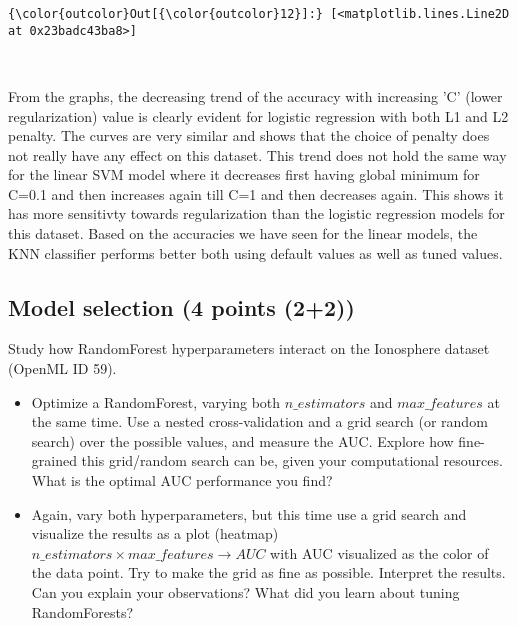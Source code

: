 \documentclass[11pt]{article}
\providecommand{\tightlist}{%
      \setlength{\itemsep}{0pt}\setlength{\parskip}{0pt}}
\begin{document}
            \begin{Verbatim}[commandchars=\\\{\}]
{\color{outcolor}Out[{\color{outcolor}12}]:} [<matplotlib.lines.Line2D at 0x23badc43ba8>]
\end{Verbatim}
        
    \begin{center}
    \end{center}
    { \hspace*{\fill} \\}
    
    From the graphs, the decreasing trend of the accuracy with increasing
'C' (lower regularization) value is clearly evident for logistic
regression with both L1 and L2 penalty. The curves are very similar and
shows that the choice of penalty does not really have any effect on this
dataset. This trend does not hold the same way for the linear SVM model
where it decreases first having global minimum for C=0.1 and then
increases again till C=1 and then decreases again. This shows it has
more sensitivty towards regularization than the logistic regression
models for this dataset. Based on the accuracies we have seen for the
linear models, the KNN classifier performs better both using default
values as well as tuned values.

    \subsection{Model selection (4 points
(2+2))}\label{model-selection-4-points-22}

Study how RandomForest hyperparameters interact on the Ionosphere
dataset (OpenML ID 59).

\begin{itemize}
\tightlist
\item
  Optimize a RandomForest, varying both \(n\_estimators\) and
  \(max\_features\) at the same time. Use a nested cross-validation and
  a grid search (or random search) over the possible values, and measure
  the AUC. Explore how fine-grained this grid/random search can be,
  given your computational resources. What is the optimal AUC
  performance you find?
\item
  Again, vary both hyperparameters, but this time use a grid search and
  visualize the results as a plot (heatmap)
  \(n\_estimators \times max\_features \rightarrow AUC\) with AUC
  visualized as the color of the data point. Try to make the grid as
  fine as possible. Interpret the results. Can you explain your
  observations? What did you learn about tuning RandomForests?
\end{itemize}
\end{document}
